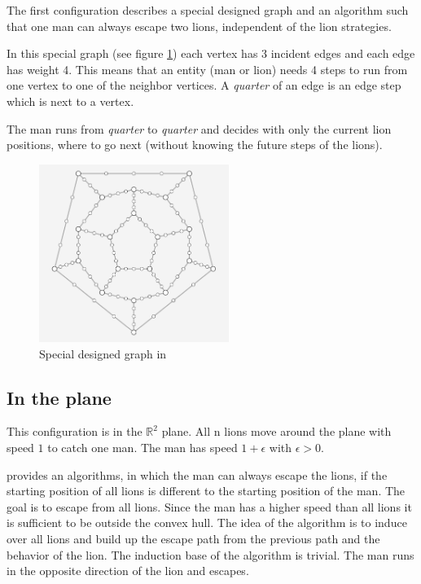 \documentclass[a4paper]{article}
\begin{document}
The first configuration describes a special designed graph and an algorithm such that one man can always escape two lions, independent of the lion strategies.

In this special graph (see figure \ref{fig:specialGraph}) each vertex has 3 incident edges and each edge has weight 4. This means that an entity (man or lion) needs 4 steps to run from one vertex to one of the neighbor vertices. A \textit{quarter} of an edge is an edge step which is next to a vertex. 

The man runs from \textit{quarter} to \textit{quarter} and decides with only the current lion positions, where to go next (without knowing the future steps of the lions).


\begin{figure}[!hbt]
  \centering
    \includegraphics[width=0.55\textwidth]{specialGraph.PNG}
  \caption{Special designed graph in \cite{paper}}
  \label{fig:specialGraph}
\end{figure}

\subsection{In the plane}

This configuration is in the $\mathbb{R}^2$ plane. All n lions move around the plane with speed $1$ to catch one man. The man has speed $1 + \epsilon$ with $\epsilon > 0$.

\cite{paper} provides an algorithms, in which the man can always escape the lions, if the starting position of all lions is different to the starting position of the man. The goal is to escape from all lions. Since the man has a higher speed than all lions it is sufficient to be outside the convex hull.
The idea of the algorithm is to induce over all lions and build up the escape path from the previous path and the behavior of the lion. The induction base of the algorithm is trivial. The man runs in the opposite direction of the lion and escapes. 
\end{document}
